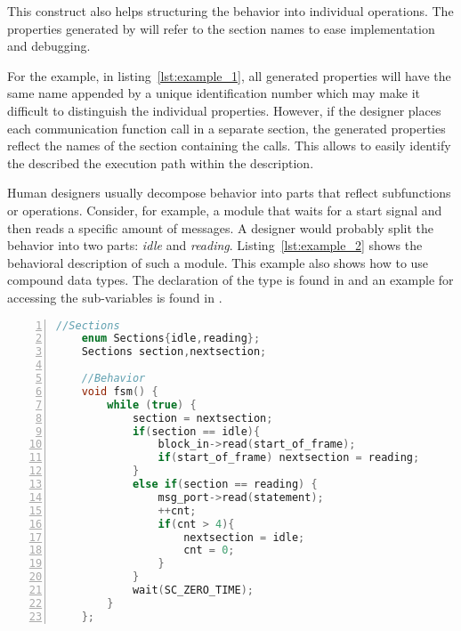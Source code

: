 This construct also helps 
structuring the behavior into individual operations. %
The properties generated by \DeSCAM{} will refer to the section names to
ease implementation and debugging. %

For the example, in listing~\ref{lst:example_1}, all generated
properties will have the same name appended by a unique identification
number which may make it difficult to distinguish the individual
properties.
However, if the designer places each communication function call in a
separate section, the generated properties reflect the names of the
section containing the calls. %
This allows to easily identify the described the execution path within
the \SYSTEMCPPA{} description. %

Human designers usually decompose behavior into parts that reflect
subfunctions or operations. %
Consider, for example, a module that waits for a start signal and then
reads a specific amount of messages. %
A designer would probably split the behavior into two parts: %
\textit{idle} and \textit{reading}. %
Listing~\ref{lst:example_2} shows the behavioral description of such a
module. %
This example also shows how to use compound data types. %
The declaration of the type is found in  and
an example for accessing the sub-variables is found in
. %

\begin{lstlisting}[language=C++,
caption={Example2},
label={lst:example_2},
numbers=left,
captionpos=b,   
basicstyle={\footnotesize},
xleftmargin=5.0ex]
    //Sections
    enum Sections{idle,reading};
    Sections section,nextsection;

    //Behavior
    void fsm() {
        while (true) {
            section = nextsection;
            if(section == idle){
                block_in->read(start_of_frame);
                if(start_of_frame) nextsection = reading;
            }
            else if(section == reading) {
                msg_port->read(statement);
                ++cnt;
                if(cnt > 4){
                    nextsection = idle;
                    cnt = 0;
                }
            }
            wait(SC_ZERO_TIME);
        }
    };
\end{lstlisting}


